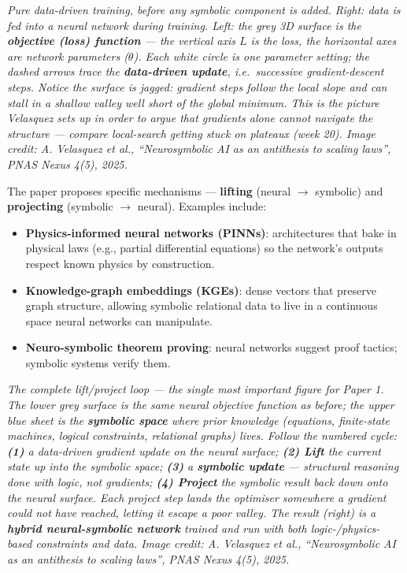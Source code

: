 \documentclass[11pt, a4paper]{article}
\begin{document}
\begin{center}

\footnotesize\textit{Pure data-driven training, before any symbolic component is added. Right: data is fed into a neural network during \emph{training}. Left: the grey 3D surface is the \textbf{objective (loss) function} --- the vertical axis $L$ is the loss, the horizontal axes are network parameters ($\theta$). Each white circle is one parameter setting; the dashed arrows trace the \textbf{data-driven update}, i.e.\ successive gradient-descent steps. Notice the surface is \emph{jagged}: gradient steps follow the local slope and can stall in a shallow valley well short of the global minimum. This is the picture Velasquez sets up in order to argue that gradients alone cannot navigate the structure --- compare local-search getting stuck on plateaux (week 20). Image credit: A. Velasquez et al., ``Neurosymbolic AI as an antithesis to scaling laws'', PNAS Nexus 4(5), 2025.}
\end{center}

The paper proposes specific mechanisms — \textbf{lifting} (neural $\to$ symbolic) and \textbf{projecting} (symbolic $\to$ neural). Examples include:
\begin{itemize}
  \item \textbf{Physics-informed neural networks (PINNs)}: architectures that bake in physical laws (e.g., partial differential equations) so the network's outputs respect known physics by construction.
  \item \textbf{Knowledge-graph embeddings (KGEs)}: dense vectors that preserve graph structure, allowing symbolic relational data to live in a continuous space neural networks can manipulate.
  \item \textbf{Neuro-symbolic theorem proving}: neural networks suggest proof tactics; symbolic systems verify them.
\end{itemize}

\begin{center}

\footnotesize\textit{The complete lift/project loop --- the single most important figure for Paper 1. The lower grey surface is the same neural objective function as before; the upper blue sheet is the \textbf{symbolic space} where prior knowledge (equations, finite-state machines, logical constraints, relational graphs) lives. Follow the numbered cycle: \textbf{(1)} a data-driven gradient update on the neural surface; \textbf{(2) Lift} the current state up into the symbolic space; \textbf{(3)} a \textbf{symbolic update} --- structural reasoning done with logic, not gradients; \textbf{(4) Project} the symbolic result back down onto the neural surface. Each project step lands the optimiser somewhere a gradient could not have reached, letting it escape a poor valley. The result (right) is a \textbf{hybrid neural-symbolic network} trained and run with both logic-/physics-based constraints and data. Image credit: A. Velasquez et al., ``Neurosymbolic AI as an antithesis to scaling laws'', PNAS Nexus 4(5), 2025.}
\end{center}
\end{document}
